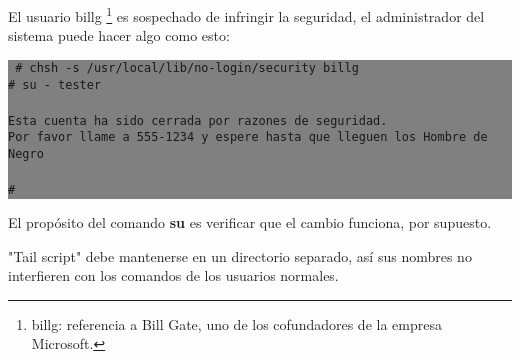 \documentclass[12pt]{article}
\begin{document}
El usuario billg
	\footnote{ billg: referencia a
	Bill Gate, uno de los cofundadores de la empresa Microsoft.} es sospechado
	de infringir la seguridad, el
administrador del sistema puede hacer algo como esto: 



\colorbox{grey}{\parbox[t]{0.95\linewidth}{ \vspace*{0.5cm} 
{\tt  
\# chsh -s /usr/local/lib/no-login/security billg \\
\# su - tester \\
 \\
    Esta cuenta ha sido cerrada por razones de seguridad. \\
    Por favor llame a 555-1234 y espere hasta que lleguen los Hombre de Negro  \\
 \\
\#  
} \vspace*{0.5cm} } } 



El propósito del comando \textbf{su} es verificar que el cambio
funciona, por supuesto.  

"Tail script" debe mantenerse en un directorio separado, así sus nombres
no interfieren con los comandos de los usuarios normales.
\end{document}

